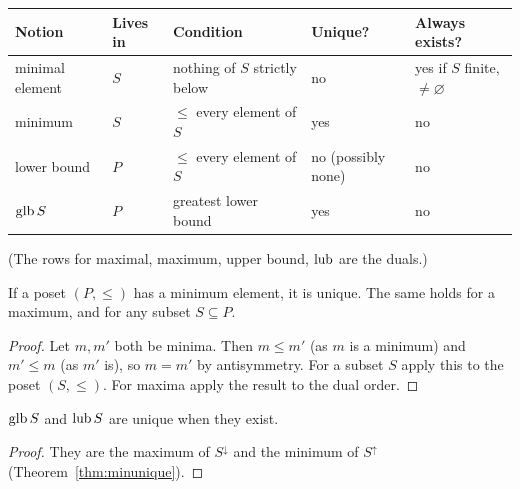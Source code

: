 \begin{center}
	\begin{tabular}{@{}p{3.0cm}p{1.9cm}p{4.5cm}p{1.9cm}p{2.3cm}@{}}
		\toprule
		\textbf{Notion} & \textbf{Lives in} & \textbf{Condition} & \textbf{Unique?} & \textbf{Always exists?}\\
		\midrule
		minimal element & $S$ & nothing of $S$ strictly below & no & yes if $S$ finite, $\ne\varnothing$\\
		minimum & $S$ & $\le$ every element of $S$ & yes & no\\
		lower bound & $P$ & $\le$ every element of $S$ & no (possibly none) & no\\
		$\operatorname{glb} S$ & $P$ & greatest lower bound & yes & no\\
		\bottomrule
	\end{tabular}
\end{center}
(The rows for maximal, maximum, upper bound, $\operatorname{lub}$ are the duals.)

\begin{theorem}\label{thm:minunique}
	If a poset $(P,\le)$ has a minimum element, it is unique. The same holds for a maximum, and for any subset $S\subseteq P$.
\end{theorem}
\begin{proof}
	Let $m,m'$ both be minima. Then $m\le m'$ (as $m$ is a minimum) and $m'\le m$ (as $m'$ is), so $m=m'$ by antisymmetry. For a subset $S$ apply this to the poset $(S,\le)$. For maxima apply the result to the dual order.
\end{proof}

\begin{corollary}
	$\operatorname{glb} S$ and $\operatorname{lub} S$ are unique when they exist.
\end{corollary}
\begin{proof}
	They are the maximum of $S^\downarrow$ and the minimum of $S^\uparrow$ (Theorem~\ref{thm:minunique}).
\end{proof}

